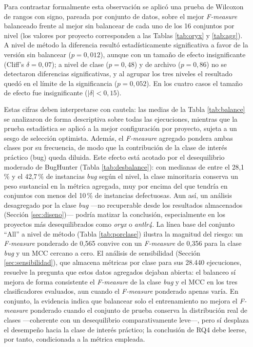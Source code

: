 \documentclass[conference,a4paper]{IEEEtran}
\begin{document}
Para contrastar formalmente esta observación se aplicó una prueba de Wilcoxon de rangos con signo, pareada por conjunto de datos, sobre el mejor \textit{F-measure} balanceado frente al mejor sin balancear de cada uno de los 16 conjuntos por nivel (los valores por proyecto corresponden a las Tablas \ref{tab:oryx} y \ref{tab:agg}). A nivel de método la diferencia resultó estadísticamente significativa a favor de la versión sin balancear ($p = 0{,}012$), aunque con un tamaño de efecto insignificante (Cliff's $\delta = 0{,}07$); a nivel de clase ($p = 0{,}48$) y de archivo ($p = 0{,}86$) no se detectaron diferencias significativas, y al agrupar los tres niveles el resultado quedó en el límite de la significancia ($p = 0{,}052$). En los cuatro casos el tamaño de efecto fue insignificante ($|\delta| < 0{,}15$).

Estas cifras deben interpretarse con cautela: las medias de la Tabla \ref{tab:balance} se analizaron de forma descriptiva sobre todas las ejecuciones, mientras que la prueba estadística se aplicó a la mejor configuración por proyecto, sujeta a un sesgo de selección optimista. Además, el \textit{F-measure} agregado pondera ambas clases por su frecuencia, de modo que la contribución de la clase de interés práctico (bug) queda diluida. Este efecto está acotado por el desequilibrio moderado de BugHunter (Tabla \ref{tab:desbalance}): con medianas de entre el 28,1\,\% y el 42,7\,\% de instancias \textit{bug} según el nivel, la clase minoritaria conserva un peso sustancial en la métrica agregada, muy por encima del que tendría en conjuntos con menos del 10\,\% de instancias defectuosas. Aun así, un análisis desagregado por la clase \textit{bug} ---no recuperable desde los resultados almacenados (Sección \ref{sec:diseno})--- podría matizar la conclusión, especialmente en los proyectos más desequilibrados como \textit{oryx} o \textit{antlr4}. La línea base del conjunto ``All'' a nivel de método (Tabla \ref{tab:porclase}) ilustra la magnitud del riesgo: un \textit{F-measure} ponderado de 0,565 convive con un \textit{F-measure} de 0,356 para la clase \textit{bug} y un MCC cercano a cero. El análisis de sensibilidad (Sección \ref{sec:sensibilidad}), que almacena métricas por clase para sus 28.440 ejecuciones, resuelve la pregunta que estos datos agregados dejaban abierta: el balanceo sí mejora de forma consistente el \textit{F-measure} de la clase \textit{bug} y el MCC en los tres clasificadores evaluados, aun cuando el \textit{F-measure} ponderado apenas varía. En conjunto, la evidencia indica que balancear solo el entrenamiento no mejora el \textit{F-measure} ponderado cuando el conjunto de prueba conserva la distribución real de clases ---coherente con un desequilibrio comparativamente leve---, pero sí desplaza el desempeño hacia la clase de interés práctico; la conclusión de RQ4 debe leerse, por tanto, condicionada a la métrica empleada.
\end{document}
